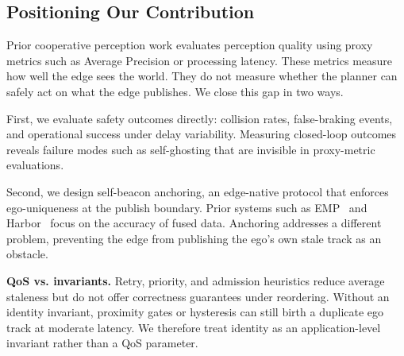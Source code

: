 
\subsection{Positioning Our Contribution}
Prior cooperative perception work evaluates perception quality using proxy metrics such as Average Precision or processing latency. These metrics measure how well the edge sees the world. They do not measure whether the planner can safely act on what the edge publishes. We close this gap in two ways.

First, we evaluate safety outcomes directly: collision rates, false-braking events, and operational success under delay variability. Measuring closed-loop outcomes reveals failure modes such as self-ghosting that are invisible in proxy-metric evaluations.

Second, we design self-beacon anchoring, an edge-native protocol that enforces ego-uniqueness at the publish boundary. Prior systems such as EMP~\cite{EMP} and Harbor~\cite{harbor} focus on the accuracy of fused data. Anchoring addresses a different problem, preventing the edge from publishing the ego's own stale track as an obstacle.

\noindent\textbf{QoS vs. invariants.}
Retry, priority, and admission heuristics reduce average staleness but do not offer correctness guarantees under reordering. Without an identity invariant, proximity gates or hysteresis can still birth a duplicate ego track at moderate latency. We therefore treat identity as an application-level invariant rather than a QoS parameter.



